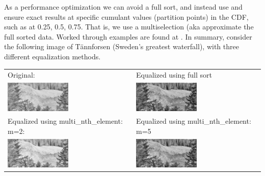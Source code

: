 As a performance optimization we can avoid a full sort, and instead use  and ensure exact results at specific cumulant values (partition points) in the CDF, such as at 0.25, 0.5, 0.75. That is, we use a multiselection (aka  approximate the full sorted data. Worked through examples are found at \cite{p2375RefImpl}. In summary, consider the following image of Tännforsen (Sweden's greatest waterfall), with three different equalization methods.

\begin{tabular}{|l|l|} 
\hline
Original: & Equalized using full sort\\
\includegraphics[width=0.50\textwidth]{plotting/examples/forsen_roundtrip.small.jpg} &
\includegraphics[width=0.50\textwidth]{plotting/examples/forsen_sort.small.jpg} \\
\hline
Equalized using multi_nth_element: m=2: & Equalized using multi_nth_element: m=5\\
\includegraphics[width=0.50\textwidth]{plotting/examples/forsen_partition2.small.jpg} &
\includegraphics[width=0.50\textwidth]{plotting/examples/forsen_partition5.small.jpg}\\
\hline
\end{tabular}
\enlargethispage*{1em}

